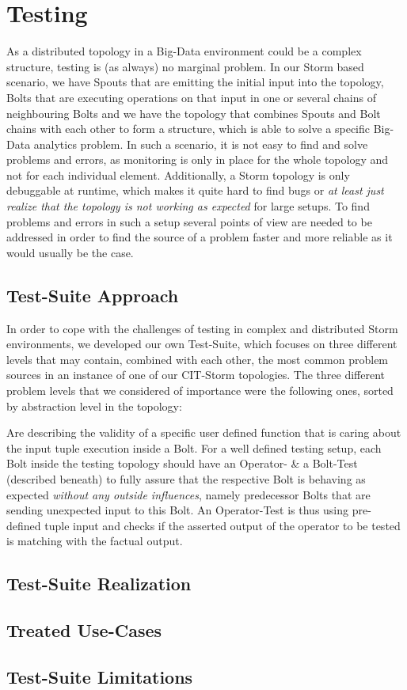 \section{Testing}
\label{sect:testing}

	As a distributed topology in a Big-Data environment could be a complex structure, testing is (as always) no marginal problem. In our Storm based scenario, we have Spouts that are emitting the initial input into the topology, Bolts that are executing operations on that input in one or several chains of neighbouring Bolts and we have the topology that combines Spouts and Bolt chains with each other to form a structure, which is able to solve a specific Big-Data analytics problem. In such a scenario, it is not easy to find and solve problems and errors, as monitoring is only in place for the whole topology and not for each individual element. Additionally, a Storm topology is only debuggable at runtime, which makes it quite hard to find bugs or \textit{at least just realize that the topology is not working as expected} for large setups. To find problems and errors in such a setup several points of view are needed to be addressed in order to find the source of a problem faster and more reliable as it would 
usually be the case.
	
\subsection{Test-Suite Approach}
	In order to cope with the challenges of testing in complex and distributed Storm environments, we developed our own Test-Suite, which focuses on three different levels that may contain, combined with each other, the most common problem sources in an instance of one of our CIT-Storm topologies. The three different problem levels that we considered of importance were the following ones, sorted by abstraction level in the topology:
	
	\begin{description}
		Are describing the validity of a specific user defined function that is caring about the input tuple execution inside a Bolt. For a well defined testing setup, each Bolt inside the testing topology should have an Operator- \& a Bolt-Test (described beneath) to fully assure that the respective Bolt is behaving as expected \textit{without any outside influences}, namely predecessor Bolts that are sending unexpected input to this Bolt. An Operator-Test is thus using pre-defined tuple input and checks if the asserted output of the operator to be tested is matching with the factual output.
	\end{description}

\subsection{Test-Suite Realization}
	

\subsection{Treated Use-Cases}

\subsection{Test-Suite Limitations}
	